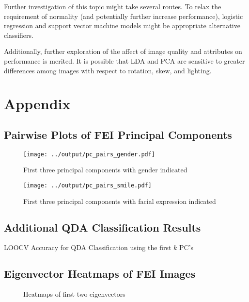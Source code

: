 \documentclass{article}
\begin{document}
\begin{multicols}{2}
  Further investigation of this topic might take several routes. To relax the requirement of normality (and potentially further increase performance), logistic regression and support vector machine models might be appropriate alternative classifiers.
  
  Additionally, further exploration of the affect of image quality and attributes on performance is merited. It is possible that LDA and PCA are sensitive to greater differences among images with respect to rotation, skew, and lighting.
  \printbibliography   
  \vfill
  \end{multicols}

  \section{Appendix}
  
  \subsection{Pairwise Plots of FEI Principal Components}
  
  \begin{figure}[!ht]
  \centering
  \texttt{[image: ../output/pc\_pairs\_gender.pdf]}
  \captionsetup{labelformat=simple}
  \caption{First three principal components with gender indicated}
  \end{figure}
  
  \begin{figure}[!ht]
  \centering
  \texttt{[image: ../output/pc\_pairs\_smile.pdf]}
  \captionsetup{labelformat=simple}
  \caption{First three principal components with facial expression indicated}
  \end{figure}
  
  
  \subsection{Additional QDA Classification Results}
  \noindent
  \begin{minipage}{\columnwidth}
    \makeatletter
    \newcommand{\@captype}{figure}
    \makeatother
    \centering
    \qquad%
    \caption{LOOCV Accuracy for QDA Classification using the first $k$ PC's}
  \end{minipage}
  
  \clearpage
  \subsection{Eigenvector Heatmaps of FEI Images}
  \begin{figure}[!ht]
  \captionsetup[subfigure]{labelformat=empty}
  \centering
  \captionsetup{labelformat=simple}
  \caption{Heatmaps of first two eigenvectors}
  \end{figure}
  
\end{document}
